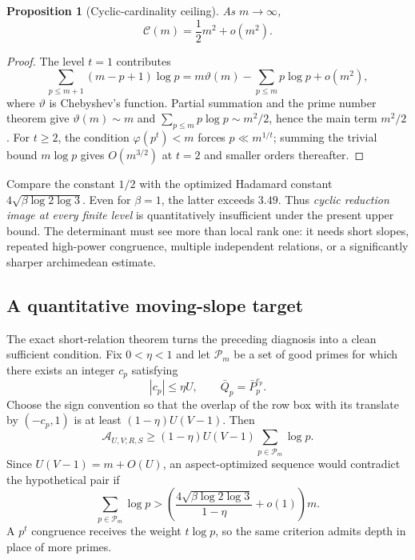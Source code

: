 \documentclass[11pt]{article}
\newtheorem{proposition}[theorem]{Proposition}
\theoremstyle{definition}
\theoremstyle{remark}
\begin{document}
\begin{proposition}[Cyclic-cardinality ceiling]
\label{prop:cyclic-ceiling}
As $m\to\infty$,
\begin{equation}
 \mathscr C(m)=\frac12m^2+o(m^2).
 \label{eq:cyclic-ceiling}
\end{equation}
\end{proposition}

\begin{proof}
The level $t=1$ contributes
\[
 \sum_{p\le m+1}(m-p+1)\log p
 =m\vartheta(m)-\sum_{p\le m}p\log p+o(m^2),
\]
where $\vartheta$ is Chebyshev's function.  Partial summation and the prime number theorem give
$\vartheta(m)\sim m$ and $\sum_{p\le m}p\log p\sim m^2/2$, hence the main term $m^2/2$.  For $t\ge2$, the condition $\varphi(p^t)<m$ forces $p\ll m^{1/t}$; summing the trivial bound $m\log p$ gives $O(m^{3/2})$ at $t=2$ and smaller orders thereafter.
\end{proof}

Compare the constant $1/2$ with the optimized Hadamard constant
$4\sqrt{\beta\log2\log3}$.  Even for $\beta=1$, the latter exceeds $3.49$.  Thus \emph{cyclic reduction image at every finite level} is quantitatively insufficient under the present upper bound.  The determinant must see more than local rank one: it needs short slopes, repeated high-power congruence, multiple independent relations, or a significantly sharper archimedean estimate.

\subsection{A quantitative moving-slope target}

The exact short-relation theorem turns the preceding diagnosis into a clean sufficient condition.  Fix $0<\eta<1$ and let $\mathcal P_m$ be a set of good primes for which there exists an integer $c_p$ satisfying
\[
 |c_p|\le\eta U,
 \qquad
 \bar Q_p=\bar P_p^{c_p}.
\]
Choose the sign convention so that the overlap of the row box with its translate by $(-c_p,1)$ is at least $(1-\eta)U(V-1)$.  Then
\begin{equation}
 \mathscr A_{U,V;R,S}
 \ge (1-\eta)U(V-1)
     \sum_{p\in\mathcal P_m}\log p.
 \label{eq:moving-slope-lower}
\end{equation}
Since $U(V-1)=m+O(U)$, an aspect-optimized sequence would contradict the hypothetical pair if
\begin{equation}
 \sum_{p\in\mathcal P_m}\log p
 >\left(\frac{4\sqrt{\beta\log2\log3}}{1-\eta}+o(1)\right)m.
 \label{eq:moving-slope-target}
\end{equation}
A $p^t$ congruence receives the weight $t\log p$, so the same criterion admits depth in place of more primes.
\end{document}
